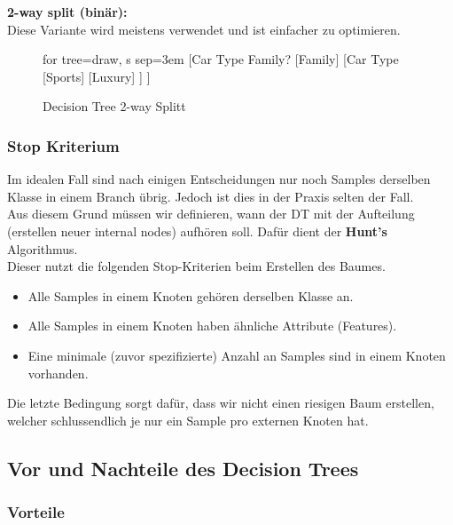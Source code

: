 \textbf{2-way split (binär):}\\
Diese Variante wird meistens verwendet und ist einfacher zu optimieren.

\begin{figure}[H]
	\centering
	\label{fig:dt_binary}
	\begin{forest}
	for tree={draw, s sep=3em}
	[Car Type Family?
	    [Family]
	    [Car Type
	    	[Sports]
	    	[Luxury]
	    ]
	]
	\end{forest}
	\caption{Decision Tree 2-way Splitt}
\end{figure}


\subsubsection{Stop Kriterium}

Im idealen Fall sind nach einigen Entscheidungen nur noch Samples derselben Klasse in einem Branch übrig.  Jedoch ist dies in der Praxis selten der Fall. \\

Aus diesem Grund müssen wir definieren, wann der DT mit der Aufteilung (erstellen neuer internal nodes) aufhören soll. Dafür dient der \textbf{Hunt's} Algorithmus. \\

Dieser nutzt die folgenden Stop-Kriterien beim Erstellen des Baumes.

\begin{itemize}
	\item Alle Samples in einem Knoten gehören derselben Klasse an.
	\item Alle Samples in einem Knoten haben ähnliche Attribute (Features).
	\item Eine minimale (zuvor spezifizierte) Anzahl an Samples sind in einem Knoten vorhanden.
\end{itemize}

Die letzte Bedingung sorgt dafür, dass wir nicht einen riesigen Baum erstellen, welcher schlussendlich je nur ein Sample pro externen Knoten hat.

\newpage
\subsection{Vor und Nachteile des Decision Trees}

\subsubsection{Vorteile}

